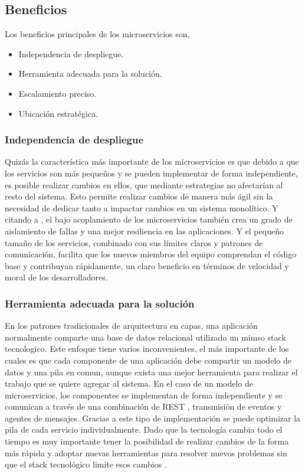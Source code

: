 \subsection{Beneficios}

Los beneficios principales de los microservicios son,
\begin{itemize}
    \item Independencia de despliegue.
    \item Herramienta adecuada para la solución.
    \item Escalamiento preciso.
    \item Ubicación estratégica.
\end{itemize}

\subsubsection{Independencia de despliegue}

    Quizás la característica más importante de los microservicios es que debido a que los servicios son más pequeños y se pueden implementar de forma independiente, es posible realizar cambios en ellos, que mediante estrategias no afectarían al resto del sistema. Esto permite realizar cambios de manera más ágil sin la necesidad de dedicar tanto a impactar cambios en un sistema monolítico.
    Y citando a \cite{ibmmicroservicios}, el bajo acoplamiento de los microservicios también crea un grado de aislamiento de fallas y una mejor resiliencia en las aplicaciones. Y el pequeño tamaño de los servicios, combinado con sus límites claros y patrones de comunicación, facilita que los nuevos miembros del equipo comprendan el código base y contribuyan rápidamente, un claro beneficio en términos de velocidad y moral de los desarrolladores.\par


\subsubsection{Herramienta adecuada para la solución}

    En los patrones tradicionales de arquitectura en capas, una aplicación normalmente comparte una base de datos relacional utilizado un mimso stack tecnologico. Este enfoque tiene varios inconvenientes, el más importante de los cuales es que cada componente de una aplicación debe compartir un modelo de datos y una pila en comun, aunque exista una mejor herramienta para realizar el trabajo que se quiere agregar al sistema.
    En el caso de un modelo de microservicios, los componentes se implementan de forma independiente y se comunican a través de una combinación de REST \cite{RESTWikimedia2022Jan}, transmisión de eventos y agentes de mensajes. Gracias a este tipo de implementación se puede optimizar la pila de cada servicio individualmente. Dado que la tecnología cambia todo el tiempo es muy importante tener la posibilidad de realizar cambios de la forma más rápida y adoptar nuevas herramientas para resolver nuevos problemas sin que el stack tecnológico limite esos cambios \cite{ibmmicroservicios}.\par

